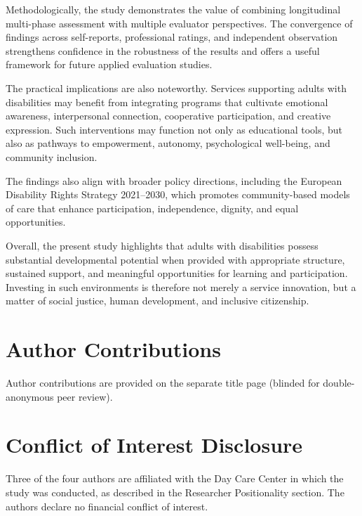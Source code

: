 \documentclass[12pt,a4paper]{article}
\begin{document}
Methodologically, the study demonstrates the value of combining longitudinal multi-phase assessment with multiple evaluator perspectives. The convergence of findings across self-reports, professional ratings, and independent observation strengthens confidence in the robustness of the results and offers a useful framework for future applied evaluation studies.

The practical implications are also noteworthy. Services supporting adults with disabilities may benefit from integrating programs that cultivate emotional awareness, interpersonal connection, cooperative participation, and creative expression. Such interventions may function not only as educational tools, but also as pathways to empowerment, autonomy, psychological well-being, and community inclusion.

The findings also align with broader policy directions, including the European Disability Rights Strategy 2021--2030, which promotes community-based models of care that enhance participation, independence, dignity, and equal opportunities.

Overall, the present study highlights that adults with disabilities possess substantial developmental potential when provided with appropriate structure, sustained support, and meaningful opportunities for learning and participation. Investing in such environments is therefore not merely a service innovation, but a matter of social justice, human development, and inclusive citizenship.


\section*{Author Contributions}
Author contributions are provided on the separate title page (blinded for double-anonymous peer review).


\section*{Conflict of Interest Disclosure}
Three of the four authors are affiliated with the Day Care Center in which the study was conducted, as described in the Researcher Positionality section. The authors declare no financial conflict of interest.
\end{document}
